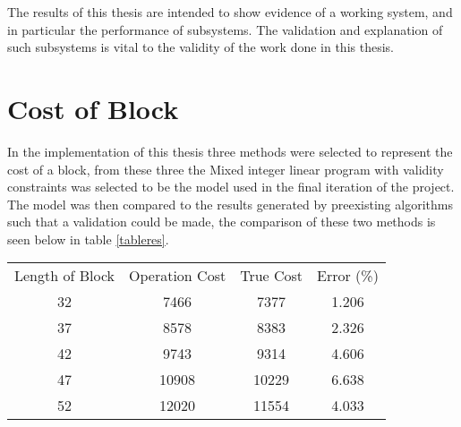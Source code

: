 
The results of this thesis are intended to show evidence of a working system, and in particular the performance of subsystems. The validation and explanation of such subsystems is vital to the validity of the work done in this thesis. 
\section{Cost of Block}
In the implementation of this thesis three methods were selected to represent the cost of a block, from these three the Mixed integer linear program with validity constraints was selected to be the model used in the final iteration of the project. The model was then compared to the results generated by preexisting algorithms\cite{A*Search} such that a validation could be made, the comparison of these two methods is seen below in table \ref{tableres}. 

\begin{center}
\label{tableres}
 \begin{tabular}{|c| c| c|c|} 
 \hline
 Length of Block & Operation Cost& True Cost & Error (\%)\\ 
 32 & 7466 & 7377 & 1.206\\ 
 \hline
 37 & 8578 & 8383 & 2.326 \\
 \hline
 42 & 9743 & 9314 & 4.606 \\
 \hline
 47 & 10908 & 10229 & 6.638 \\
 \hline
 52 & 12020 & 11554 & 4.033\\ 
 \hline
\end{tabular}
\end{center}



